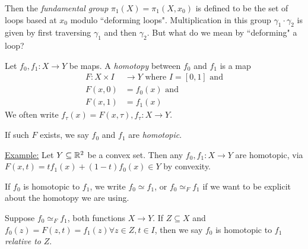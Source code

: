 \documentclass[10pt,a4paper]{article}
\begin{document}
Then the \emph{fundamental group} $\pi_1(X) = \pi_1(X, x_0)$ is defined to be the set of loops based at $x_0$ modulo ``deforming loops". Multiplication in this group $\gamma_1 \cdot \gamma_2$ is given by first traversing $\gamma_1$ and then $\gamma_2$. But what do we mean by ``deforming" a loop?

Let $f_0, f_1: X \rightarrow Y$ be maps. A \emph{homotopy} between $f_0$ and $f_1$ is a map
\begin{align*}
F:X\times I &\rightarrow Y \text{ where $I=[0,1]$ and}\\
F(x,0) &= f_0(x) \text{ and }\\
F(x,1) &= f_1(x)
\end{align*}
We often write $f_\tau(x) = F(x,\tau), f_\tau:X\rightarrow Y$.

If such $F$ exists, we say $f_0$ and $f_1$ are \emph{homotopic}.

\underline{Example:} Let $Y\subseteq \mathbb{R}^2$ be a convex set. Then any $f_0, f_1:X\rightarrow Y$ are homotopic, via $F(x,t) = tf_1(x) + (1-t)f_0(x) \in Y$ by convexity.
\begin{center}
\end{center}

If $f_0$ is homotopic to $f_1$, we write $f_0 \simeq f_1$, or $f_0 \simeq_F f_1$ if we want to be explicit about the homotopy we are using.

Suppose $f_0 \simeq_F f_1$, both functions $X \rightarrow Y$. If $Z\subseteq X$ and $f_0(z)=F(z,t) = f_1(z) \forall z \in Z, t \in I$, then we say $f_0$ is homotopic to $f_1$ \emph{relative to} $Z$.
\end{document}
